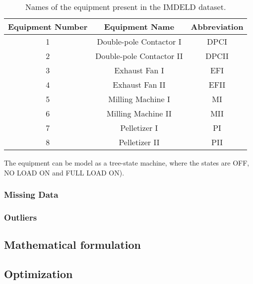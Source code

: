 \begin{table}[H]
\centering
\small
\begin{tabular}{|c|c|c|}
\hline
\textbf{Equipment Number} & \textbf{Equipment Name}     & \textbf{Abbreviation} \\ \hline
1                         & Double-pole Contactor I     & DPCI                  \\ \hline
2                         & Double-pole Contactor II    & DPCII                 \\ \hline
3                         & Exhaust Fan I               & EFI                   \\ \hline
4                         & Exhaust Fan II              & EFII                  \\ \hline
5                         & Milling Machine I           & MI                    \\ \hline
6                         & Milling Machine II          & MII                   \\ \hline
7                         & Pelletizer I                & PI                    \\ \hline
8                         & Pelletizer II               & PII                   \\ \hline
\end{tabular}
\caption{Names of the equipment present in the IMDELD dataset.}
\label{TableEquipmentNames}
\end{table}

The equipment can be model as a tree-state machine, where the states are OFF, NO LOAD ON and FULL LOAD ON).



\subsubsection{Missing Data}
\subsubsection{Outliers}





\subsection{Mathematical formulation}


\subsection{Optimization}


